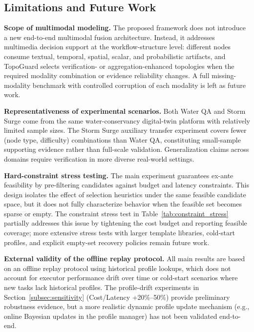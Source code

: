 \documentclass[manuscript,review,anonymous]{acmart}
\begin{document}
\subsection{Limitations and Future Work}
\label{subsec:limitations}

\textbf{Scope of multimodal modeling.} The proposed framework does not introduce a new end-to-end multimodal fusion architecture. Instead, it addresses multimedia decision support at the workflow-structure level: different nodes consume textual, temporal, spatial, scalar, and probabilistic artifacts, and TopoGuard selects verification- or aggregation-enhanced topologies when the required modality combination or evidence reliability changes. A full missing-modality benchmark with controlled corruption of each modality is left as future work.

\textbf{Representativeness of experimental scenarios.} Both Water QA and Storm Surge come from the same water-conservancy digital-twin platform with relatively limited sample sizes. The Storm Surge auxiliary transfer experiment covers fewer (node type, difficulty) combinations than Water QA, constituting small-sample supporting evidence rather than full-scale validation. Generalization claims across domains require verification in more diverse real-world settings.

\textbf{Hard-constraint stress testing.} The main experiment guarantees ex-ante feasibility by pre-filtering candidates against budget and latency constraints. This design isolates the effect of selection heuristics under the same feasible candidate space, but it does not fully characterize behavior when the feasible set becomes sparse or empty. The constraint stress test in Table~\ref{tab:constraint_stress} partially addresses this issue by tightening the cost budget and reporting feasible coverage; more extensive stress tests with larger template libraries, cold-start profiles, and explicit empty-set recovery policies remain future work.

\textbf{External validity of the offline replay protocol.} All main results are based on an offline replay protocol using historical profile lookups, which does not account for executor performance drift over time or cold-start scenarios where new tasks lack historical profiles. The profile-drift experiments in Section~\ref{subsec:sensitivity} (Cost/Latency +20\%--50\%) provide preliminary robustness evidence, but a more realistic dynamic profile update mechanism (e.g., online Bayesian updates in the profile manager) has not been validated end-to-end.
\end{document}
